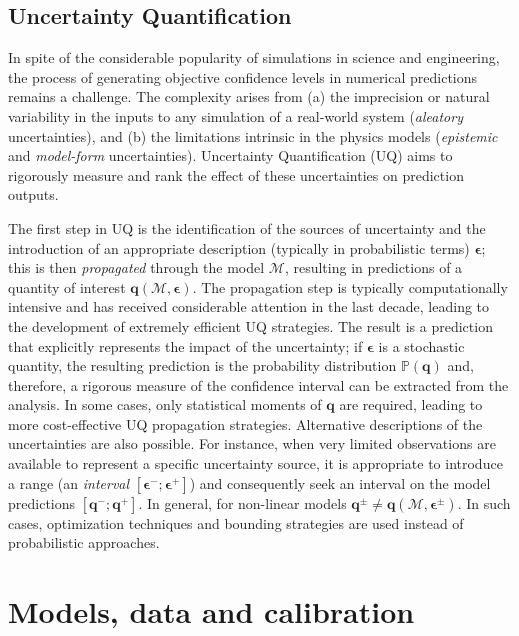 \documentclass[a4paper]{ar-1col}
\begin{document}
\begin{textbox}[h]
\section{Uncertainty Quantification}

In spite of the considerable popularity of simulations in science and engineering, the process of generating objective confidence levels 
in numerical predictions remains a challenge. The complexity arises from (a) the imprecision or natural variability in the inputs to any 
simulation of a real-world system ({\it aleatory} uncertainties), and (b) the limitations intrinsic in the
physics models ({\it epistemic} and {\it model-form} uncertainties). 
Uncertainty Quantification (UQ) aims to  rigorously measure and rank  the effect of these uncertainties on prediction outputs. 

The first step in UQ is  the identification of the sources of uncertainty and the introduction of an appropriate description (typically in probabilistic terms) $\bm{\epsilon}$;
this is then {\it propagated} through the  model $\mathcal{M}$, resulting in predictions of a quantity of interest $\mathbf{q}( \mathcal{M}, \bm{\epsilon})$.
The propagation step is typically computationally intensive and has received considerable attention in the last decade, leading to the development of extremely efficient 
UQ strategies. The result is a prediction that  explicitly represents the impact of the uncertainty; if $\bm{\epsilon}$ is a stochastic quantity, the resulting
prediction is the probability distribution $ \mathbb P(\mathbf{q})$ and, therefore, a rigorous measure of the confidence interval can be extracted from the analysis.
In some cases, only statistical moments of $\mathbf{q}$ are required, leading to  more cost-effective UQ propagation strategies.
Alternative descriptions of the uncertainties are also possible. For instance, when very limited observations are available to represent a specific uncertainty source,
it is appropriate to  introduce a range (an {\it interval} $[\bm{\epsilon}^-;\bm{\epsilon}^+]$)  and consequently seek an interval on the model predictions  $[\mathbf{q}^-; \mathbf{q}^+]$.
In general, for non-linear models $\mathbf{q}^{\pm} \ne \mathbf{q}( \mathcal{M}, \bm{\epsilon}^{\pm} )$. In such cases, optimization techniques and bounding strategies are used instead
of probabilistic approaches.

\end{textbox}


\section{Models, data and calibration}
\label{sec:models-data}
\end{document}
